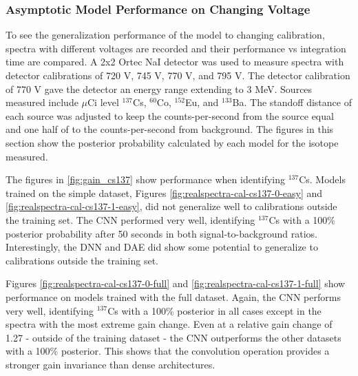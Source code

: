 \subsubsection{Asymptotic Model Performance on Changing Voltage}

To see the generalization performance of the model to changing calibration, spectra with different voltages are recorded and their performance vs integration time are compared. A 2x2 Ortec NaI detector was used to measure spectra with detector calibrations of 720 V, 745 V, 770 V, and 795 V. The detector calibration of 770 V gave the detector an energy range extending to 3 MeV. Sources measured include $\mu$Ci level $^{137}$Cs, $^{60}$Co, $^{152}$Eu, and $^{133}$Ba. The standoff distance of each source was adjusted to keep the counts-per-second from the source equal and one half of to the counts-per-second from background. The figures in this section show the posterior probability calculated by each model for the isotope measured.

The figures in \ref{fig:gain_cs137} show performance when identifying $^{137}$Cs. Models trained on the simple dataset, Figures \ref{fig:realspectra-cal-cs137-0-easy} and \ref{fig:realspectra-cal-cs137-1-easy}, did not generalize well to calibrations outside the training set. The CNN performed very well, identifying $^{137}$Cs with a 100\% posterior probability after 50 seconds in both signal-to-background ratios. Interestingly, the DNN and DAE did show some potential to generalize to calibrations outside the training set. 

Figures \ref{fig:realspectra-cal-cs137-0-full} and \ref{fig:realspectra-cal-cs137-1-full} show performance on models trained with the full dataset. Again, the CNN performs very well, identifying $^{137}$Cs with a 100\% posterior in all cases except in the spectra with the most extreme gain change. Even at a relative gain change of 1.27 - outside of the training dataset - the CNN outperforms the other datasets with a 100\% posterior. This shows that the convolution operation provides a stronger gain invariance than dense architectures. 

